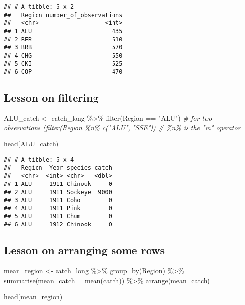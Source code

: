 \documentclass[
]{article}
\newenvironment{Shaded}{\begin{snugshade}}{\end{snugshade}}
\newcommand{\AttributeTok}[1]{\textcolor[rgb]{0.77,0.63,0.00}{#1}}
\newcommand{\CommentTok}[1]{\textcolor[rgb]{0.56,0.35,0.01}{\textit{#1}}}
\newcommand{\FunctionTok}[1]{\textcolor[rgb]{0.00,0.00,0.00}{#1}}
\newcommand{\NormalTok}[1]{#1}
\newcommand{\OtherTok}[1]{\textcolor[rgb]{0.56,0.35,0.01}{#1}}
\newcommand{\SpecialCharTok}[1]{\textcolor[rgb]{0.00,0.00,0.00}{#1}}
\newcommand{\StringTok}[1]{\textcolor[rgb]{0.31,0.60,0.02}{#1}}
\begin{document}
\begin{verbatim}
## # A tibble: 6 x 2
##   Region number_of_observations
##   <chr>                   <int>
## 1 ALU                       435
## 2 BER                       510
## 3 BRB                       570
## 4 CHG                       550
## 5 CKI                       525
## 6 COP                       470
\end{verbatim}

\hypertarget{lesson-on-filtering}{%
\subsection{Lesson on filtering}\label{lesson-on-filtering}}

\begin{Shaded}
\begin{Highlighting}[]
\NormalTok{ALU\_catch }\OtherTok{\textless{}{-}}\NormalTok{ catch\_long }\SpecialCharTok{\%\textgreater{}\%}
  \FunctionTok{filter}\NormalTok{(Region }\SpecialCharTok{==} \StringTok{"ALU"}\NormalTok{)}
\CommentTok{\# for two observations (filter(Region \%n\% c("ALU", "SSE"))}
\CommentTok{\# \%n\% is the "in" operator}

\FunctionTok{head}\NormalTok{(ALU\_catch)}
\end{Highlighting}
\end{Shaded}

\begin{verbatim}
## # A tibble: 6 x 4
##   Region  Year species catch
##   <chr>  <int> <chr>   <dbl>
## 1 ALU     1911 Chinook     0
## 2 ALU     1911 Sockeye  9000
## 3 ALU     1911 Coho        0
## 4 ALU     1911 Pink        0
## 5 ALU     1911 Chum        0
## 6 ALU     1912 Chinook     0
\end{verbatim}

\hypertarget{lesson-on-arranging-some-rows}{%
\subsection{Lesson on arranging some
rows}\label{lesson-on-arranging-some-rows}}

\begin{Shaded}
\begin{Highlighting}[]
\NormalTok{mean\_region }\OtherTok{\textless{}{-}}\NormalTok{ catch\_long }\SpecialCharTok{\%\textgreater{}\%} 
  \FunctionTok{group\_by}\NormalTok{(Region) }\SpecialCharTok{\%\textgreater{}\%} 
  \FunctionTok{summarise}\NormalTok{(}\AttributeTok{mean\_catch =} \FunctionTok{mean}\NormalTok{(catch)) }\SpecialCharTok{\%\textgreater{}\%} 
  \FunctionTok{arrange}\NormalTok{(mean\_catch)}

\FunctionTok{head}\NormalTok{(mean\_region)}
\end{Highlighting}
\end{Shaded}
\end{document}
